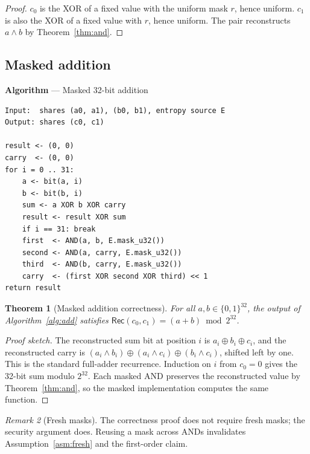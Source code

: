 \documentclass[11pt,a4paper]{article}
\newcommand{\bits}{\{0,1\}}
\newcommand{\Rec}{\mathsf{Rec}}
\theoremstyle{plain}
\newtheorem{theorem}{Theorem}[section]
\theoremstyle{definition}
\theoremstyle{remark}
\newtheorem{remark}[theorem]{Remark}
\newcounter{algblock}
\newenvironment{algorithmblock}[1]{%
  \par\medskip\refstepcounter{algblock}%
  \noindent\textbf{Algorithm \thealgblock} --- #1\par\nopagebreak
  \noindent\begin{minipage}{\linewidth}\small
}{%
  \end{minipage}\par\medskip
}
\begin{document}
\begin{proof}
\(c_0\) is the XOR of a fixed value with the uniform mask \(r\), hence uniform. \(c_1\)
is also the XOR of a fixed value with \(r\), hence uniform. The pair reconstructs
\(a\wedge b\) by Theorem~\ref{thm:and}.
\end{proof}

\subsection{Masked addition}

\begin{algorithmblock}{Masked 32-bit addition}\label{alg:add}
\begin{verbatim}
Input:  shares (a0, a1), (b0, b1), entropy source E
Output: shares (c0, c1)

result <- (0, 0)
carry  <- (0, 0)
for i = 0 .. 31:
    a <- bit(a, i)
    b <- bit(b, i)
    sum <- a XOR b XOR carry
    result <- result XOR sum
    if i == 31: break
    first  <- AND(a, b, E.mask_u32())
    second <- AND(a, carry, E.mask_u32())
    third  <- AND(b, carry, E.mask_u32())
    carry  <- (first XOR second XOR third) << 1
return result
\end{verbatim}
\end{algorithmblock}

\begin{theorem}[Masked addition correctness]\label{thm:add}
For all \(a,b\in\bits^{32}\), the output of Algorithm~\ref{alg:add} satisfies
\(\Rec(c_0,c_1)=(a+b)\bmod 2^{32}\).
\end{theorem}

\begin{proof}[Proof sketch]
The reconstructed sum bit at position \(i\) is \(a_i\oplus b_i\oplus c_i\), and the
reconstructed carry is
\((a_i\wedge b_i)\oplus(a_i\wedge c_i)\oplus(b_i\wedge c_i)\), shifted left by one.
This is the standard full-adder recurrence. Induction on \(i\) from \(c_0=0\) gives
the 32-bit sum modulo \(2^{32}\). Each masked AND preserves the reconstructed value by
Theorem~\ref{thm:and}, so the masked implementation computes the same function.
\end{proof}

\begin{remark}[Fresh masks]
The correctness proof does not require fresh masks; the security argument does. Reusing
a mask across ANDs invalidates Assumption~\ref{asm:fresh} and the first-order claim.
\end{remark}
\end{document}
